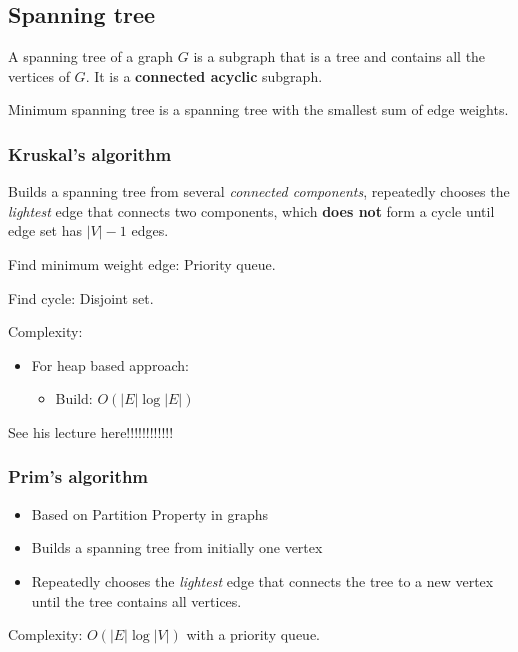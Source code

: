 \documentclass[letterpaper,12pt]{article}
\begin{document}
\subsection{Spanning tree}
A spanning tree of a graph $G$ is a subgraph that is a tree and contains all the vertices of $G$. It is a \textbf{connected acyclic} subgraph.

Minimum spanning tree is a spanning tree with the smallest sum of edge weights.
\subsubsection{Kruskal's algorithm}
Builds a spanning tree from several \textit{connected components}, repeatedly chooses the \textit{lightest} edge that connects two components, which \textbf{does not} form a cycle until edge set has $|V| - 1$ edges.
\begin{algorithmic}
        \EndIf
    \EndWhile
\end{algorithmic}
Find minimum weight edge: Priority queue.

Find cycle: Disjoint set.

Complexity: \begin{itemize}
    \item For heap based approach: \begin{itemize}
        \item Build: $O(|E|\log |E|)$
    \end{itemize}
\end{itemize}
See his lecture here!!!!!!!!!!!!
\subsubsection{Prim's algorithm}
\begin{itemize}
    \item Based on Partition Property in graphs
    \item Builds a spanning tree from initially one vertex
    \item Repeatedly chooses the \textit{lightest} edge that connects the tree to a new vertex until the tree contains all vertices.
\end{itemize}
\begin{algorithmic}
    \EndWhile
\end{algorithmic}
Complexity: $O(|E|\log |V|)$ with a priority queue.
\end{document}
